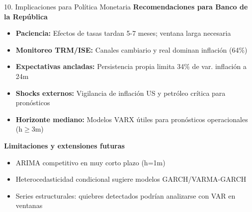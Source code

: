 \documentclass[spanish, 11pt]{beamer}
\begin{document}
\begin{frame}{10. Implicaciones para Política Monetaria}
\normalsize
\vspace{0.3cm}
\textbf{Recomendaciones para Banco de la República}

\begin{itemize}
  \item \textbf{Paciencia:} Efectos de tasas tardan 5-7 meses; ventana larga necesaria
  \vspace{0.15cm}
  \item \textbf{Monitoreo TRM/ISE:} Canales cambiario y real dominan inflación (64\%)
  \vspace{0.15cm}
  \item \textbf{Expectativas ancladas:} Persistencia propia limita 34\% de var. inflación a 24m
  \vspace{0.15cm}
  \item \textbf{Shocks externos:} Vigilancia de inflación US y petróleo crítica para pronósticos
  \vspace{0.15cm}
  \item \textbf{Horizonte mediano:} Modelos VARX útiles para pronósticos operacionales (h$\geq$3m)
\end{itemize}

\vspace{0.4cm}
\textbf{Limitaciones y extensiones futuras}
\begin{itemize}
  \item ARIMA competitivo en muy corto plazo (h=1m)
  \item Heterocedasticidad condicional sugiere modelos GARCH/VARMA-GARCH
  \item Series estructurales: quiebres detectados podrían analizarse con VAR en ventanas
\end{itemize}
\end{frame}
\end{document}
